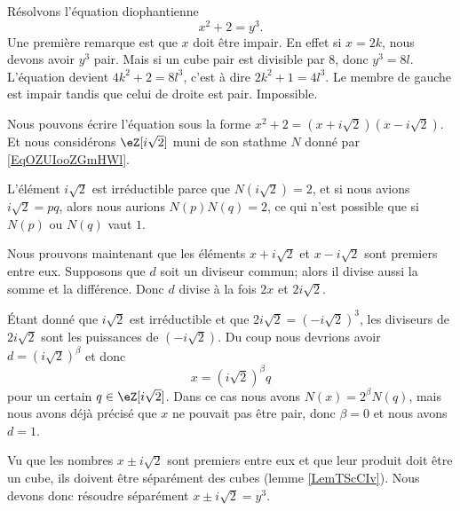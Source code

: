\begin{example}     \label{ExmuQisZU}
    Résolvons l'équation diophantienne 
    \begin{equation}
        x^2+2=y^3.
    \end{equation}
    Une première remarque est que \( x\) doit être impair. En effet si \( x=2k\), nous devons avoir \( y^3\) pair. Mais si un cube pair est divisible par \( 8\), donc \( y^3=8l\). L'équation devient \( 4k^2+2=8l^3\), c'est à dire \( 2k^2+1=4l^3\). Le membre de gauche est impair tandis que celui de droite est pair. Impossible.

    Nous pouvons écrire l'équation sous la forme \( x^2+2=(x+i\sqrt{2})(x-i\sqrt{2})\). Et nous considérons \( \eZ[i\sqrt{2}]\) muni de son stathme \( N\) donné par \eqref{EqOZUIooZGmHWl}.

    L'élément \( i\sqrt{2}\) est irréductible parce que \( N(i\sqrt{2})=2\), et si nous avions \( i\sqrt{2}=pq\), alors nous aurions \( N(p)N(q)=2\), ce qui n'est possible que si \( N(p)\) ou \( N(q)\) vaut \( 1\).

    Nous prouvons maintenant que les éléments \( x+i\sqrt{2}\) et \( x-i\sqrt{2}\) sont premiers entre eux. Supposons que \( d\) soit un diviseur commun; alors il divise aussi la somme et la différence. Donc \( d\) divise à la fois \( 2x\) et \( 2i\sqrt{2}\).

    Étant donné que \( i\sqrt{2}\) est irréductible et que \( 2i\sqrt{2}=(-i\sqrt{2})^3\), les diviseurs de \( 2i\sqrt{2}\) sont les puissances de \( (-i\sqrt{2})\). Du coup nous devrions avoir \( d=(i\sqrt{2})^{\beta}\) et donc
    \begin{equation}
        x=(i\sqrt{2})^{\beta}q
    \end{equation}
    pour un certain \( q\in\eZ[i\sqrt{2}]\). Dans ce cas nous avons \( N(x)=2^{\beta}N(q)\), mais nous avons déjà précisé que \( x\) ne pouvait pas être pair, donc \( \beta=0\) et nous avons \( d=1\).

    Vu que les nombres \( x\pm i\sqrt{2}\) sont premiers entre eux et que leur produit doit être un cube, ils doivent être séparément des cubes (lemme \ref{LemTScCIv}). Nous devons donc résoudre séparément \( x\pm i\sqrt{2}=y^3\).


\end{example}
